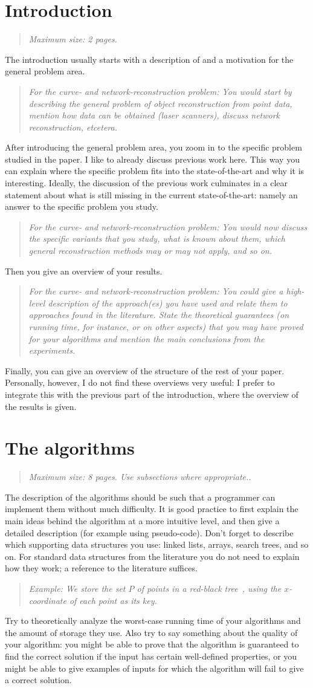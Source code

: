 \documentclass[11pt]{article}
\newcommand{\maxsize}[1]{\begin{quotation} {\sl \noindent Maximum size: #1.} \end{quotation}}
\newcommand{\crp}[1]{\begin{quotation} {\sl \noindent For the curve- and network-reconstruction problem: #1} \end{quotation}}
\newcommand{\example}[1]{\begin{quotation} {\sl \noindent Example: #1} \end{quotation}}
\begin{document}
\section{Introduction}
\label{se:introduction}
\maxsize{2 pages}
The introduction usually starts with a description of and
a motivation for the general problem area.
%
\crp{You would start by
describing the general problem of object reconstruction from point data,
mention how data can be obtained (laser scanners), discuss network reconstruction, etcetera.}
%
After introducing the general problem area, you zoom in to the specific problem
studied in the paper. I like to already discuss previous work here. This way
you can explain where the specific problem fits into the state-of-the-art
and why it is interesting. Ideally, the discussion of the previous work
culminates in a clear statement about what is still missing in the current
state-of-the-art: namely an answer to the specific problem you study.
%
\crp{You would now discuss the specific variants that you study, 
what is known about them, which general reconstruction methods may or may not apply, and so on.}
%
Then you give an overview of your results.
%
\crp{You could give a high-level description of the
approach(es) you have used and relate them to approaches found in the literature.
State the theoretical guarantees (on running time,
for instance, or on other aspects) that you may have proved for your algorithms
and mention the main conclusions from the experiments.}
%
Finally, you can give an overview of the structure of the rest of your paper.
Personally, however, I do not find these overviews very useful: I prefer to
integrate this with the previous part of the introduction, where the overview
of the results is given.

\section{The algorithms}
\label{se:algorithms}
\maxsize{8 pages. Use subsections where appropriate.}
%
The description of the algorithms should be such that a programmer can
implement them without much difficulty. It is good practice to first explain the
main ideas behind the algorithm at a more intuitive level, and then give a
detailed description (for example using pseudo-code).
Don't forget to describe which supporting data structures you use:
linked lists, arrays, search trees, and so on. For standard data structures
from the literature you do not need to explain how they work; a reference
to the literature suffices.
%
\example{We store the set $P$ of points in a red-black tree~\cite{clrs-ia-01},
         using the $x$-coordinate of each point as its key.}
%
Try to theoretically analyze the worst-case running time of your algorithms
and the amount of storage they use. Also try to say something about the quality of your algorithm: you might
be able to prove that the algorithm is guaranteed to find the correct solution if the
input has certain well-defined properties, or you might be able to give examples
of inputs for which the algorithm will fail to give a correct solution.
\end{document}
